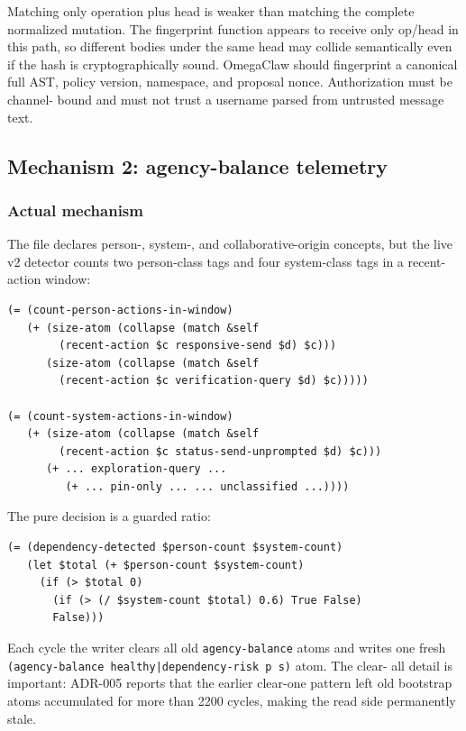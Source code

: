 \documentclass[11pt]{article}
\begin{document}
Matching only operation plus head is weaker than matching the complete normalized
mutation.  The fingerprint function appears to receive only op/head in this path,
so different bodies under the same head may collide semantically even if the hash
is cryptographically sound.  OmegaClaw should fingerprint a canonical full AST,
policy version, namespace, and proposal nonce.  Authorization must be channel-
bound and must not trust a username parsed from untrusted message text.

\subsection{Mechanism 2: agency-balance telemetry}

\subsubsection{Actual mechanism}

The file declares person-, system-, and collaborative-origin concepts, but the
live v2 detector counts two person-class tags and four system-class tags in a
recent-action window:

\begin{lstlisting}
(= (count-person-actions-in-window)
   (+ (size-atom (collapse (match &self
        (recent-action $c responsive-send $d) $c)))
      (size-atom (collapse (match &self
        (recent-action $c verification-query $d) $c)))))

(= (count-system-actions-in-window)
   (+ (size-atom (collapse (match &self
        (recent-action $c status-send-unprompted $d) $c)))
      (+ ... exploration-query ...
         (+ ... pin-only ... ... unclassified ...))))
\end{lstlisting}

The pure decision is a guarded ratio:

\begin{lstlisting}
(= (dependency-detected $person-count $system-count)
   (let $total (+ $person-count $system-count)
     (if (> $total 0)
       (if (> (/ $system-count $total) 0.6) True False)
       False)))
\end{lstlisting}

Each cycle the writer clears all old \texttt{agency-balance} atoms and writes
one fresh \texttt{(agency-balance healthy|dependency-risk p s)} atom.  The clear-
all detail is important: ADR-005 reports that the earlier clear-one pattern left
old bootstrap atoms accumulated for more than 2200 cycles, making the read side
permanently stale.
\end{document}
